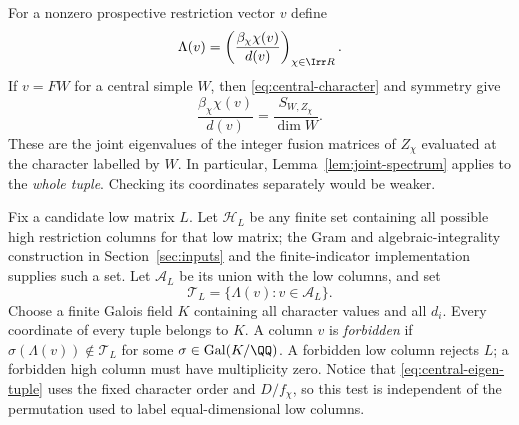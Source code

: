 For a nonzero prospective restriction vector $v$ define
\begin{equation}\label{eq:central-eigen-tuple}
 \Lambda(v)=
 \left(\frac{\beta_\chi\chi(v)}{d(v)}\right)_{\chi\in\Irr R}.
\end{equation}
If $v=FW$ for a central simple $W$, then
\eqref{eq:central-character} and symmetry give
\[
 \frac{\beta_\chi\chi(v)}{d(v)}
       =\frac{S_{W,Z_\chi}}{\dim W}.
\]
These are the joint eigenvalues of the integer fusion matrices of
$Z_\chi$ evaluated at the character labelled by $W$. In particular,
Lemma~\ref{lem:joint-spectrum} applies to the \emph{whole tuple}.
Checking its coordinates separately would be weaker.

Fix a candidate low matrix $L$. Let $\mathcal H_L$ be any finite set
containing all possible high restriction columns for that low matrix;
the Gram and algebraic-integrality construction in
Section~\ref{sec:inputs} and the finite-indicator implementation supplies
such a set. Let $\mathcal A_L$ be its union with the low columns, and set
\[
 \mathcal T_L=\{\Lambda(v):v\in\mathcal A_L\}.
\]
Choose a finite Galois field $K$ containing all character values and all
$d_i$. Every coordinate of every tuple belongs to $K$. A column $v$ is
\emph{forbidden} if $\sigma(\Lambda(v))\notin\mathcal T_L$ for some
$\sigma\in\operatorname{Gal}(K/\QQ)$. A forbidden low column rejects
$L$; a forbidden high column must have multiplicity zero. Notice that
\eqref{eq:central-eigen-tuple} uses the fixed character order and
$D/f_\chi$, so this test is independent of the permutation used to
label equal-dimensional low columns.

